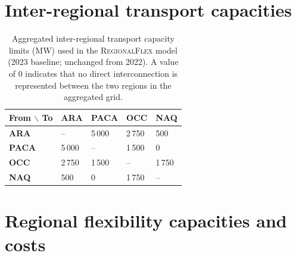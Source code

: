 \documentclass[12pt]{article}
\begin{document}
\section{Inter-regional transport capacities}\label{app:transport}

\begin{table}[H]
\centering
\setlength{\tabcolsep}{6pt}
\renewcommand{\arraystretch}{1.15}
\begin{tabularx}{\linewidth}{X X X X X}
\toprule
\textbf{From $\backslash$ To} & \textbf{ARA} & \textbf{PACA} & \textbf{OCC} & \textbf{NAQ} \\
\midrule
\textbf{ARA}  & --   & 5\,000 & 2\,750 & 500 \\
\textbf{PACA} & 5\,000 & --   & 1\,500 & 0 \\
\textbf{OCC}  & 2\,750 & 1\,500 & --   & 1\,750 \\
\textbf{NAQ}  & 500  & 0     & 1\,750 & -- \\
\bottomrule
\end{tabularx}

\vspace{2mm}
\caption{Aggregated inter-regional transport capacity limits (MW) used in the \textsc{RegionalFlex} model (2023 baseline; unchanged from 2022). A value of 0 indicates that no direct interconnection is represented between the two regions in the aggregated grid.}
\label{tab:transport_capacities}
\end{table}

\section{Regional flexibility capacities and costs}\label{app:capacities}
\end{document}
